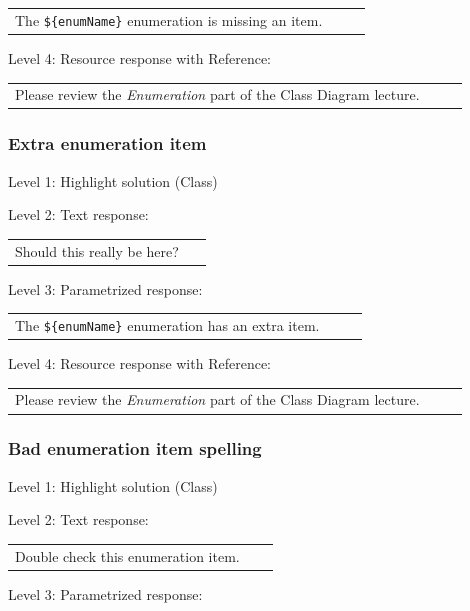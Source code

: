 \begin{tabular}{|p{0.9\linewidth}}
The \verb|${enumName}| enumeration is missing an item.
\end{tabular} \medskip

\noindent Level 4: Resource response with Reference: \medskip

\begin{tabular}{|p{0.9\linewidth}}
Please review the \textit{Enumeration} part of the Class Diagram lecture.
\end{tabular} \medskip


\subsubsection{Extra enumeration item}

\noindent Level 1: Highlight solution (Class) \medskip

\noindent Level 2: Text response: \medskip

\begin{tabular}{|p{0.9\linewidth}}
Should this really be here?
\end{tabular} \medskip

\noindent Level 3: Parametrized response: \medskip

\begin{tabular}{|p{0.9\linewidth}}
The \verb|${enumName}| enumeration has an extra item.
\end{tabular} \medskip

\noindent Level 4: Resource response with Reference: \medskip

\begin{tabular}{|p{0.9\linewidth}}
Please review the \textit{Enumeration} part of the Class Diagram lecture.
\end{tabular} \medskip


\subsubsection{Bad enumeration item spelling}

\noindent Level 1: Highlight solution (Class) \medskip

\noindent Level 2: Text response: \medskip

\begin{tabular}{|p{0.9\linewidth}}
Double check this enumeration item.
\end{tabular} \medskip

\noindent Level 3: Parametrized response: \medskip

